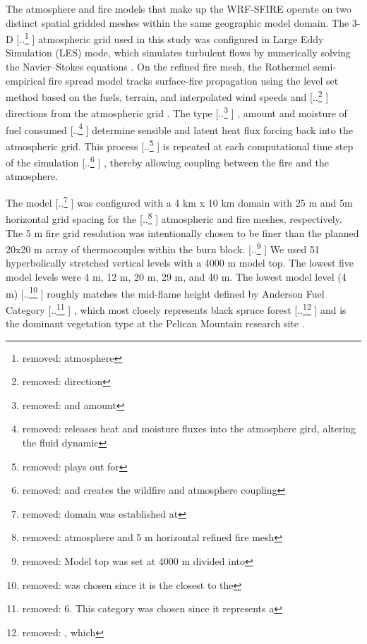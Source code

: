 \documentclass[preprints,article,accept,moreauthors,pdftex]{Definitions/mdpi}
\providecommand{\DIFadd}[1]{{\protect\color{blue} \sf #1}} %
\providecommand{\DIFdel}[1]{{\protect\color{red} [..\footnote{removed: #1} ]}} %
\providecommand{\DIFaddbegin}{} %
\providecommand{\DIFaddend}{} %
\providecommand{\DIFdelbegin}{} %
\providecommand{\DIFdelend}{} %
\begin{document}
The atmosphere and fire models that make up the WRF-SFIRE operate on two distinct spatial gridded meshes within the same geographic model domain. The 3-D \DIFdelbegin \DIFdel{atmosphere }\DIFdelend \DIFaddbegin \DIFadd{atmospheric }\DIFaddend grid used in this study was configured in Large Eddy Simulation (LES) mode, which simulates turbulent flows by numerically solving the Navier–Stokes equations \cite{mandel_coupled_2011,mandel_recent_2014}. On the refined fire mesh, the Rothermel semi-empirical fire spread model tracks surface-fire propagation using the level set method based on the fuels, terrain, and interpolated wind speeds and \DIFdelbegin \DIFdel{direction }\DIFdelend \DIFaddbegin \DIFadd{directions }\DIFaddend from the atmospheric grid \cite{mandel_coupled_2011,mandel_recent_2014,munozesparza_accurate_2018}. The type\DIFdelbegin \DIFdel{and amount }\DIFdelend \DIFaddbegin \DIFadd{, amount and moisture }\DIFaddend of fuel consumed \DIFdelbegin \DIFdel{releases heat and moisture fluxes into the atmosphere gird, altering the fluid dynamic}\DIFdelend \DIFaddbegin \DIFadd{determine sensible and latent heat flux forcing back into the atmospheric grid}\DIFaddend . This process \DIFdelbegin \DIFdel{plays out for }\DIFdelend \DIFaddbegin \DIFadd{is repeated at }\DIFaddend each computational time step of the simulation\DIFdelbegin \DIFdel{and creates the wildfire and atmosphere coupling}\DIFdelend \DIFaddbegin \DIFadd{, thereby allowing coupling between the fire and the atmosphere}\DIFaddend .

The model \DIFdelbegin \DIFdel{domain was established at }\DIFdelend \DIFaddbegin \DIFadd{was configured with a }\DIFaddend 4 km x 10 km \DIFaddbegin \DIFadd{domain }\DIFaddend with 25 m \DIFaddbegin \DIFadd{and 5m }\DIFaddend horizontal grid spacing for the \DIFdelbegin \DIFdel{atmosphere and 5 m horizontal refined fire mesh}\DIFdelend \DIFaddbegin \DIFadd{atmospheric and fire meshes, respectively}\DIFaddend . The 5 m fire grid resolution was \DIFaddbegin \DIFadd{intentionally }\DIFaddend chosen to be finer than the planned 20x20 m array of thermocouples within the burn block. \DIFdelbegin \DIFdel{Model top was set at 4000 m divided into }\DIFdelend \DIFaddbegin \DIFadd{We used }\DIFaddend 51 hyperbolically stretched vertical levels \DIFaddbegin \DIFadd{with a 4000 m model top}\DIFaddend . The lowest five model levels were 4 m, 12 m, 20 m, 29 m, and 40 m. The lowest model level (4 m) \DIFdelbegin \DIFdel{was chosen since it is the closest to the }\DIFdelend \DIFaddbegin \DIFadd{roughly matches the }\DIFaddend mid-flame height defined by Anderson Fuel Category \DIFdelbegin \DIFdel{6. This category was chosen since it represents a }\DIFdelend \DIFaddbegin \DIFadd{6, which most closely represents }\DIFaddend black spruce forest \DIFdelbegin \DIFdel{, which }\DIFdelend \DIFaddbegin \DIFadd{and }\DIFaddend is the dominant vegetation type at the Pelican Mountain research site \cite{anderson_aids_1982}.
\end{document}
